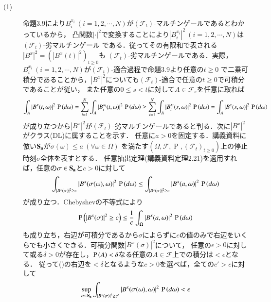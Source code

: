 \begin{prf}
\begin{description}\mbox{}
	\item[(1)] 命題3.9により$B_i^{x_i}\ (i = 1,2,\cdots,N)$が$(\mathcal{F}_t)$-マルチンゲールであるとわかっているから，
		凸関数$|\cdot|^2$で変換することにより$\left|B_i^{x_i}\right|^2\ (i = 1,2,\cdots,N)$は$(\mathcal{F}_t)$-劣マルチンゲール
		である．従ってその有限和で表される$|B^x|^2 = \left(\left|B^x(t)\right|^2\right)_{t \geq 0}$も
		$(\mathcal{F}_t)$-劣マルチンゲールである．実際，$B_i^{x_i}\ (i = 1,2,\cdots,N)$が$(\mathcal{F}_t)$-適合過程で命題3.9より任意の$t \geq 0$
		で二乗可積分であることから，$|B^x|^2$についても$(\mathcal{F}_t)$-適合で任意の$t \geq 0$で可積分であることが従い，
		また任意の$0 \leq s < t$に対して$A \in \mathcal{F}_s$を任意に取れば
		\begin{align}
			\int_{A} |B^x(t,\omega)|^2\, \operatorname{P} \left(d\omega\right) 
			= \sum_{i=1}^{N} \int_{A} |B_i^{x_i}(t,\omega)|^2\, \operatorname{P} \left(d\omega\right) 
			\geq \sum_{i=1}^{N} \int_{A} |B_i^{x_i}(s,\omega)|^2\, \operatorname{P} \left(d\omega\right) 
			= \int_{A} |B^x(s,\omega)|^2\, \operatorname{P} \left(d\omega\right) 
		\end{align}
		が成り立つから$|B^x|^2$が$(\mathcal{F}_t)$-劣マルチンゲールであると判る．次に$|B^x|^2$がクラス(DL)に属することを示す．
		任意に$a > 0$を固定する．講義資料に倣い$\bf{S}_a$が$\sigma(\omega) \leq a\ (\forall \omega \in \Omega)$
		を満たす$(\Omega, \mathcal{F}, \operatorname{P}, (\mathcal{F}_t)_{t \geq 0})$上の停止時刻$\sigma$全体を表すとする．
		任意抽出定理(講義資料定理2.21)を適用すれば，任意の$\sigma \in \bf{S}_a$と$c > 0$に対して
		\begin{align}
			\int_{|B^x(\sigma)|^2 \geq c} |B^x(\sigma(\omega), \omega)|^2\, \operatorname{P} \left(d\omega\right)
			\leq \int_{|B^x(\sigma)|^2 \geq c} |B^x(a, \omega)|^2\, \operatorname{P} \left(d\omega\right)
		\end{align}
		が成り立つ．Chebyshevの不等式により
		\begin{align}
			\operatorname{P} \left(|B^x(\sigma)|^2 \geq c\right) \leq \frac{1}{c} \int_{\Omega} |B^x(a, \omega)|^2\, \operatorname{P} \left(d\omega\right) \label{eq:stoc_report_Q2}
		\end{align}
		も成り立ち，右辺が可積分であるから$\sigma$によらずに$c$の値のみで右辺をいくらでも小さくできる．可積分関数$|B^x(\sigma)|^2$について，
		任意の$\epsilon > 0$に対して或る$\delta > 0$が存在し，$\operatorname{P} \left(A\right) < \delta$なる任意の$A \in \mathcal{F}$上での積分は$< \epsilon$となる．
		従って()の右辺を$ < \delta$となるような$c > 0$を選べば，全ての$c' > c$に対して
		\begin{align}
			\sup{\sigma \in \bf{S}_a}{\int_{|B^x(\sigma)|^2 \geq c'} |B^x(\sigma(\omega), \omega)|^2\, \prob{d\omega}} < \epsilon

\end{align}
\end{description}
\end{prf}
